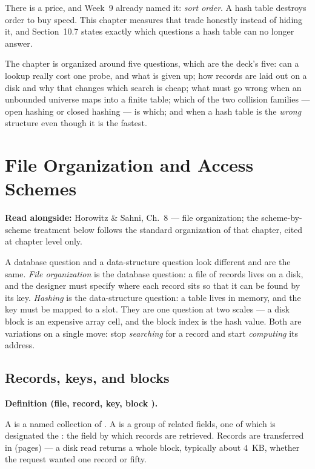 \documentclass[11pt]{article}
\newenvironment{definitionbox}[1]{%
  \par\noindent\textbf{Definition (#1).}\ \itshape
}{\par\vspace{0.3em}}
\begin{document}
There is a price, and Week~9 already named it: \emph{sort order}. A hash table destroys order to buy speed. This chapter measures that trade honestly instead of hiding it, and Section~10.7 states exactly which questions a hash table can no longer answer.

The chapter is organized around five questions, which are the deck's five: can a lookup really cost one probe, and what is given up; how records are laid out on a disk and why that changes which search is cheap; what must go wrong when an unbounded universe maps into a finite table; which of the two collision families --- open hashing or closed hashing --- is which; and when a hash table is the \emph{wrong} structure even though it is the fastest.


\section{File Organization and Access Schemes}

\textbf{Read alongside:} Horowitz \& Sahni, Ch.~8 \cite{HorowitzSahni2008_fundamentals_data_structures} --- file organization; the scheme-by-scheme treatment below follows the standard organization of that chapter, cited at chapter level only.

A database question and a data-structure question look different and are the same. \emph{File organization} is the database question: a file of records lives on a disk, and the designer must specify where each record sits so that it can be found by its key. \emph{Hashing} is the data-structure question: a table lives in memory, and the key must be mapped to a slot. They are one question at two scales --- a disk block is an expensive array cell, and the block index is the hash value. Both are variations on a single move: stop \emph{searching} for a record and start \emph{computing} its address.

\subsection{Records, keys, and blocks}

\begin{definitionbox}{file, record, key, block \cite{HorowitzSahni2008_fundamentals_data_structures}}
A  is a named collection of . A  is a group of related fields, one of which is designated the : the field by which records are retrieved. Records are transferred in  (pages) --- a disk read returns a whole block, typically about $4$~KB, whether the request wanted one record or fifty.
\end{definitionbox}
\end{document}
